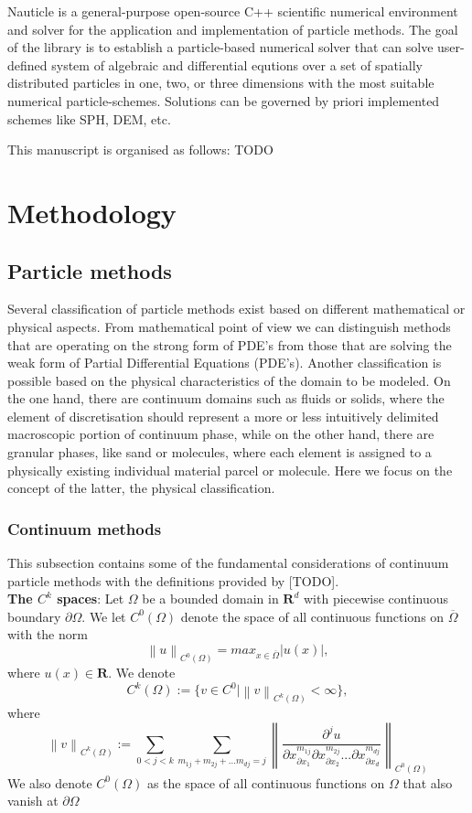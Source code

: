 \documentclass[a4paper,12pt,openany]{book}
\newcommand*{\SET}[1]  {\ensuremath{\mathbf{#1}}}
\newcommand{\R}{\SET{R}}
\newcommand{\norm}[1]{\left\lVert#1\right\rVert}
\theoremstyle{break}
\begin{document}
Nauticle is a general-purpose open-source C++ scientific numerical environment and solver for the application and implementation of particle methods. The goal of the library is to  establish a particle-based numerical solver that can solve user-defined system of algebraic and differential equtions over a set of spatially distributed particles in one, two, or three dimensions with the most suitable numerical particle-schemes. Solutions can be governed by priori implemented schemes like SPH, DEM, etc.

This manuscript is organised as follows: TODO

\section{Methodology}
\subsection{Particle methods}
Several classification of particle methods exist based on different mathematical or physical aspects. From mathematical point of view we can distinguish methods that are operating on the strong form of PDE's from those that are solving the weak form of Partial Differential Equations (PDE's). Another classification is possible based on the physical characteristics of the domain to be modeled. On the one hand, there are continuum domains such as fluids or solids, where the element of discretisation should represent a more or less intuitively delimited macroscopic portion of continuum phase, while on the other hand, there are granular phases, like sand or molecules, where each element is assigned to a physically existing individual material parcel or molecule. Here we focus on the concept of the latter, the physical classification.
\subsubsection{Continuum methods}
This subsection contains some of the fundamental considerations of continuum particle methods with the definitions provided by [TODO]. \\

\textbf{The $C^k$ spaces}: Let $\Omega$ be a bounded domain in $\R^d$ with piecewise continuous boundary $\partial\Omega$. We let $C^0(\Omega)$ denote the space of all continuous functions on $\overline{\Omega}$ with the norm
\begin{equation}
\norm{u}_{C^0(\Omega)}=max_{x\in\overline{\Omega}}|u(x)|,
\end{equation}
where $u(x)\in\R$. We denote
\begin{equation}
C^k(\Omega):=\{v\in C^0\vert\norm{v}_{C^k (\Omega)}<\infty\},
\end{equation}
where
\begin{equation}
\norm{v}_{C^k (\Omega)}:=\sum_{0<j<k}\sum_{m_{1j}+m_{2j}+...m_{dj}=j}\norm{\frac{\partial^j u}{\partial x^{m_{1j}}_{\partial x_1}\partial x^{m_{2j}}_{\partial x_2}...\partial x^{m_{dj}}_{\partial x_d}}}_{C^0(\Omega)}
\end{equation}
We also denote $C^0(\Omega)$ as the space of all continuous functions on $\Omega$ that also vanish at $\partial\Omega$
\end{document}

